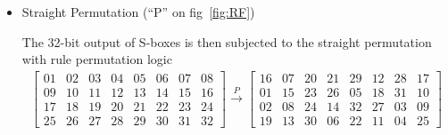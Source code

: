 \documentclass[11pt,a4paper]{article}
\begin{document}
\begin{enumerate}
\begin{itemize}
\begin{itemize}
			\item Straight Permutation (``P'' on fig~\ref{fig:RF})
			\par The 32-bit output of S-boxes is then subjected to the straight permutation with rule permutation logic
			\begin{align*}
				\begin{bmatrix}
					01 & 02 & 03 & 04 & 05 & 06 & 07 & 08 \\
					09 & 10 & 11 & 12 & 13 & 14 & 15 & 16 \\
					17 & 18 & 19 & 20 & 21 & 22 & 23 & 24 \\
					25 & 26 & 27 & 28 & 29 & 30 & 31 & 32
				\end{bmatrix}
				\xrightarrow{P}
				\begin{bmatrix}
					16 & 07 & 20 & 21 & 29 & 12 & 28 & 17 \\
					01 & 15 & 23 & 26 & 05 & 18 & 31 & 10 \\
					02 & 08 & 24 & 14 & 32 & 27 & 03 & 09 \\
					19 & 13 & 30 & 06 & 22 & 11 & 04 & 25
				\end{bmatrix}
			\end{align*}
		\end{itemize}
		

\end{itemize}
\end{enumerate}
\end{document}

